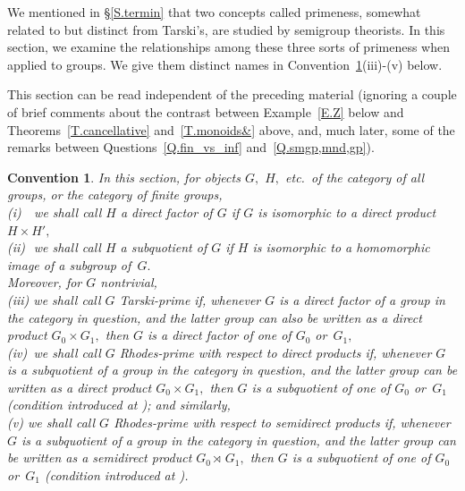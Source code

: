 \documentclass{amsart}
\newtheorem{convention}[theorem]{Convention}
\numberwithin{equation}{section}
\numberwithin{theorem}{section}
\begin{document}
We mentioned in \S\ref{S.termin} that two concepts called primeness,
somewhat related to but
distinct from Tarski's, are studied by semigroup theorists.
In this section, we examine the relationships
among these three sorts of primeness when applied to groups.
We give them distinct names in Convention~\ref{Cv.Rh&Ta}(iii)-(v)
below.

This section can be read independent of the preceding material
(ignoring a couple of brief comments about
the contrast between Example~\ref{E.Z}
below and Theorems~\ref{T.cancellative} and~\ref{T.monoids&} above,
and, much later, some of the remarks between
Questions~\ref{Q.fin_vs_inf} and~\ref{Q.smgp,mnd,gp}).

\begin{convention}\label{Cv.Rh&Ta}
In this section, for objects $G,$ $H,$ etc.\ of the
category of all groups, or the category of finite groups,\\[.5em]
%
{\rm(i)}\,\,\,\, we shall call $H$ a {\em direct factor} of $G$
if $G$ is isomorphic to a direct product $H\times H',$\\[.5em]
%
{\rm(ii)}\,\, we shall call $H$ a {\em subquotient} of $G$ if $H$
is isomorphic to a homomorphic image of a subgroup of~$G.$\\[-.6em]

Moreover, for $G$ nontrivial,\\[.5em]
%
{\rm(iii)} we shall call $G$ {\em Tarski-prime} if, whenever
$G$ is a direct factor of a group in the category in
question, and the latter group can also be written
as a direct product $G_0\times G_1,$
then $G$ is a direct factor of one of $G_0$ or~$G_1,$\\[.5em]
%
{\rm(iv)}\, we shall call $G$ {\em Rhodes-prime with respect
to direct products} if, whenever $G$ is a {\em subquotient}
of a group in the category in question, and the latter group
can be written as a direct product $G_0\times G_1,$
then $G$ is a subquotient of one of $G_0$ or~$G_1$
{\rm(}condition introduced at \cite[p.\,482, line~6]{RS}{\rm);}
and similarly,\\[.5em]
%
{\rm(v)} we shall call $G$ {\em Rhodes-prime with respect
to semidirect products} if, whenever $G$ is a subquotient
of a group in the category in question, and the latter group
can be written as a {\em semidirect} product $G_0 \rtimes\,G_1,$
then $G$ is a subquotient of one of $G_0$ or~$G_1$
{\rm(}condition introduced at \cite[p.\,228, paragraph~before
Lemma~4.1.31]{RS}{\rm)}.
\end{convention}
\end{document}
